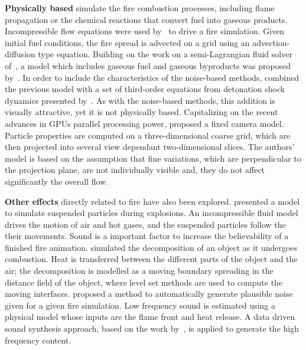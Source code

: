 \textbf{Physically based} simulate the fire combustion processes, including flame propagation or the chemical reactions that convert fuel into gaseous products.  
Incompressible flow equations were used by~\cite{Stam:1995} to drive a fire simulation.
Given initial fuel conditions, the fire spread is advected on a grid using an advection-diffusion type equation.
Building on the work on a semi-Lagrangian fluid solver of~\cite{Stam:1999}, a model which includes gaseous fuel and gaseous byproducts was proposed by~\cite{Nguyen:2002}.
In order to include the characteristics of the noise-based methods, \cite{Hong:2007} combined the previous model with a set of third-order equations from detonation shock dynamics presented by~\cite{Yao:1996}.
As with the noise-based methods, this addition is visually attractive, yet it is not physically based. 
Capitalizing on the recent advances in GPUs parallel processing power, \cite{Horvath:2009} proposed a fixed camera model.
Particle properties are computed on a three-dimensional coarse grid, which are then projected into several view dependant two-dimensional slices.
The authors' model is based on the assumption that fine variations, which are perpendicular to the projection plane, are not individually visible and, they do not affect significantly the overall flow.
 
\textbf{Other effects} directly related to fire have also been explored.
\cite{Feldman:2003} presented a model to simulate suspended particles during explosions.
An incompressible fluid model drives the motion of air and hot gases, and the suspended particles follow the their movements.
Sound is a important factor to increase the believability of a finished fire animation.
\cite{Melek:2005} simulated the decomposition of an object as it undergoes combustion.
Heat is transferred between the different parts of the object and the air; the decomposition is modelled as a moving boundary spreading in the distance field of the object, where level set methods are used to compute the moving interfaces.
\cite{Chadwick:2011} proposed a method to automatically generate plausible noise given for a given fire simulation.
Low frequency sound is estimated using a physical model whose inputs are the flame front and heat release.
A data driven sound synthesis approach, based on the work by~\cite{Wei:2000}, is applied to generate the high frequency content.



